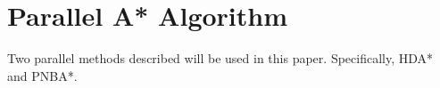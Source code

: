 

\section{Parallel A* Algorithm}
Two parallel methods described will be used in this paper. Specifically, HDA* and PNBA*.\cite{Kishimoto2009,Rios2011}

